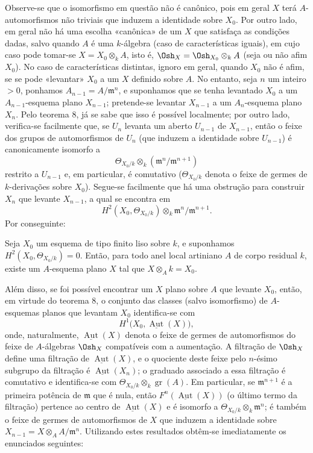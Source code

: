Observe-se que o isomorfismo em questão não é canônico, pois em geral $X$
terá $A$-automorfismos não triviais que induzem a identidade sobre $X_0$. Por
outro lado, em geral não há uma escolha «canônica» de um $X$ que satisfaça
as condições dadas, salvo quando $A$ é uma $k$-álgebra (caso de
características iguais), em cujo caso pode tomar-se $X=X_0\otimes_k A$, isto
é, $\Osh_X=\Osh_{X_0}\otimes_k A$ (seja ou não afim $X_0$). No caso de
características distintas, ignoro em geral, quando $X_0$ não é afim, se se
pode «levantar» $X_0$ a um $X$ definido sobre $A$. No entanto, seja $n$ um
inteiro $>0$, ponhamos $A_{n-1}=A/\mathfrak m^n$, e suponhamos que se tenha
levantado $X_0$ a um $A_{n-1}$-esquema plano $X_{n-1}$; pretende-se levantar
$X_{n-1}$ a um $A_n$-esquema plano $X_n$. Pelo teorema 8, já se sabe que isso
é possível localmente; por outro lado, verifica-se facilmente que, se $U_n$
levanta um aberto $U_{n-1}$ de $X_{n-1}$, então o feixe dos grupos de
automorfismos de $U_n$ (que induzem a identidade sobre $U_{n-1}$) é
canonicamente isomorfo a
\[
  \Theta_{X_0/k}\otimes_k(\mathfrak m^n/\mathfrak m^{n+1})
\]
restrito a $U_{n-1}$ e, em particular, é comutativo
($\Theta_{X_0/k}$ denota o feixe de germes de $k$-derivações sobre $X_0$).
Segue-se facilmente que há uma obstrução para construir $X_n$ que levante
$X_{n-1}$, a qual se encontra em
\[
  H^2(X_0,\Theta_{X_0/k})\otimes_k
  \mathfrak m^n/\mathfrak m^{n+1}.
\]
Por conseguinte:

 Seja $X_0$ um esquema de tipo finito liso sobre $k$, e
suponhamos $H^2(X_0,\Theta_{X_0/k})=0$. Então, para todo anel local
artiniano $A$ de corpo residual $k$, existe um $A$-esquema plano $X$ tal que
$X\otimes_A k=X_0$.

Além disso, se foi possível encontrar um $X$ plano sobre $A$ que levante $X_0$,
então, em virtude do teorema 8, o conjunto das classes (salvo isomorfismo)
de $A$-esquemas planos que levantam $X_0$ identifica-se com
\[
  H^1\bigl(X_0,\underline{\operatorname{Aut}}(X)\bigr),
\]
onde, naturalmente, $\underline{\operatorname{Aut}}(X)$ denota o feixe de
germes de automorfismos do feixe de $A$-álgebras $\Osh_X$ compatíveis com a
aumentação. A filtração de $\Osh_X$ define uma filtração de
$\underline{\operatorname{Aut}}(X)$, e o quociente deste feixe pelo $n$-ésimo
subgrupo da filtração é $\underline{\operatorname{Aut}}(X_n)$; o graduado
associado a essa filtração é comutativo e identifica-se com
$\Theta_{X_0/k}\otimes_k\operatorname{gr}(A)$. Em particular, se
$\mathfrak m^{n+1}$ é a primeira potência de $\mathfrak m$ que é nula,
então $F^n(\underline{\operatorname{Aut}}(X))$ (o último termo da
filtração) pertence ao centro de $\underline{\operatorname{Aut}}(X)$ e é
isomorfo a $\Theta_{X_0/k}\otimes_k\mathfrak m^n$; é também o feixe de
germes de automorfismos de $X$ que induzem a identidade sobre
$X_{n-1}=X\otimes_A A/\mathfrak m^n$. Utilizando estes resultados obtêm-se
imediatamente os enunciados seguintes:

